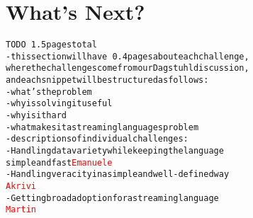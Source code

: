 \section{What's Next?}\label{sec:whatsnext}

\begin{alltt}TODO\scriptsize ~1.5 pages total
- this section will have ~0.4 pages about each challenge,
  where the challenges come from our Dagstuhl discussion,
  and each snippet will be structured as follows:
  - what's the problem
  - why is solving it useful
  - why is it hard
  - what makes it a streaming languages problem
- descriptions of individual challenges:
  - Handling data variety while keeping the language
    simple and fast \textcolor{red}{Emanuele}
  - Handling veracity in a simple and well-defined way
    \textcolor{red}{Akrivi}
  - Getting broad adoption for a streaming language
    \textcolor{red}{Martin}
\end{alltt}

